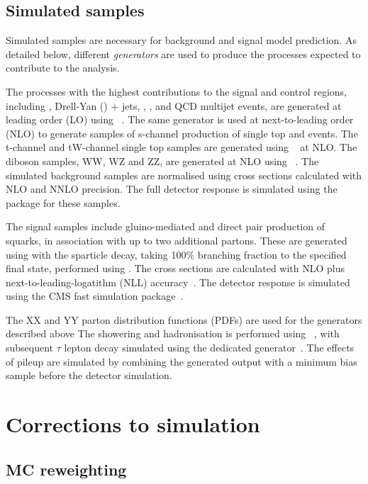 \subsection{Simulated samples}
Simulated samples are necessary for background and signal model prediction. As detailed below, 
different \emph{generators} are used to produce the processes expected to contribute to
the \alphat analysis.

The processes with the highest contributions to the signal and control regions, 
including \zj, Drell-Yan (\dy) + jets, \gj, \ttbar, \wj and QCD multijet events, are generated at leading order (LO) 
using \MADGRAPH \AMCATNLO~\cite{Alwall:2014hca}. The same generator is used at next-to-leading order (NLO)
to generate samples of s-channel production of single top and \ttV events.
The t-channel and tW-channel single top samples are generated using \POWHEG~\cite{Alioli:2010xd} at NLO.
The diboson samples, WW, WZ and ZZ, are generated at NLO using \PYTHIA~\cite{PYTHIA}. 
The simulated background samples are normalised using cross sections calculated with NLO and NNLO precision.%
The full detector response is simulated using the \GEANTfour package for these samples.

The signal samples include gluino-mediated and direct pair production of squarks, in
association with up to two additional partons. These are generated using \MADGRAPH \AMCATNLO
with the sparticle decay, taking 100\% branching fraction to the specified final state, 
performed using \PYTHIA. The cross sections are calculated with
NLO plus next-to-leading-logatithm (NLL) accuracy~\cite{sparticleXs}. The detector response
is simulated using the CMS fast simulation package~\cite{fastsim}.

The XX and YY parton distribution functions (PDFs) are used for the generators described above
The showering and hadronisation is performed using \PYTHIA~\cite{PYTHIA}, with subsequent 
$\tau$ lepton decay simulated using the dedicated \TAUOLA generator~\cite{TAUOLO}. The effects
of pileup are simulated by combining the generated output with a minimum bias sample 
before the detector simulation.

\section{Corrections to simulation}
\subsection{MC reweighting}

